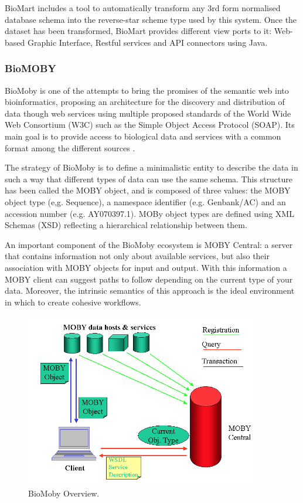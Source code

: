 BioMart includes a tool to automatically transform any 3rd form normalised database schema into the reverse-star scheme type used by this system. Once the dataset has been transformed, BioMart provides different view ports to it: Web-based Graphic Interface, Restful services and API connectors using Java.

\subsubsection{BioMOBY}
BioMoby is one of the attempts to bring the promises of the semantic web into bioinformatics, proposing an architecture for the discovery and distribution of data though web services using multiple proposed standards of the World Wide Web Consortium (W3C) such as the Simple Object Access Protocol (SOAP). Its main goal is to provide access to biological data and services with a common format among the different sources \cite{WIL2002}.

The strategy of BioMoby is to define a minimalistic entity to describe the data in such a way that different types of data can use the same schema.
This structure has been called the MOBY object, and is composed of three values: the MOBY object type (e,g. Sequence), a namespace identifier (e.g. Genbank/AC) and an accession number (e.g. AY070397.1). MOBy object types are defined using XML Schemas (XSD) reflecting a hierarchical relationship between them.

An important component of the BioMoby ecosystem is MOBY Central: a server that contains information not only about available services, but also their association with MOBY objects for input and output. With this information a MOBY client can suggest paths to follow depending on the current type of your data. Moreover, the intrinsic semantics of this approach is the ideal environment in which to create cohesive workflows.

\begin{figure}  
\centering
\includegraphics[width=4in]{figures/MOBY_Overview.png}
\caption[BioMoby Overview.]{BioMoby Overview.
\label{fig:biomoby}}
\end{figure}

